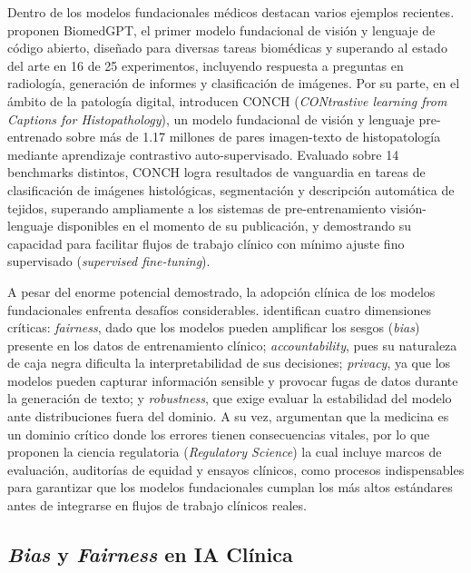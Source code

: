 Dentro de los modelos fundacionales médicos destacan varios ejemplos recientes. \textcite{Zhang2024}
proponen
BiomedGPT, el primer modelo fundacional de visión y lenguaje de código abierto, diseñado para 
diversas tareas biomédicas y superando al estado del arte en 16 de
25 experimentos, incluyendo respuesta a preguntas en radiología, generación de
informes y clasificación de imágenes. Por su parte, en el ámbito de la patología digital, \textcite{Lu2024}
introducen CONCH (\textit{CONtrastive learning from Captions for Histopathology}), 
un modelo fundacional de visión y lenguaje
pre-entrenado sobre más de 1.17 millones de pares imagen-texto de histopatología
mediante aprendizaje contrastivo auto-supervisado. Evaluado sobre 14 benchmarks
distintos, CONCH logra resultados de vanguardia en tareas de clasificación de
imágenes histológicas, segmentación y descripción automática de tejidos,
superando ampliamente a los sistemas de
pre-entrenamiento visión-lenguaje disponibles en el momento de su publicación,
y demostrando su capacidad para facilitar flujos de trabajo clínico con mínimo
ajuste fino supervisado (\textit{supervised fine-tuning}).

A pesar del enorme potencial demostrado, la adopción clínica de los modelos
fundacionales enfrenta desafíos considerables. \textcite{liu2024surveymedicallargelanguage} identifican
 cuatro
dimensiones críticas: \textit{fairness}, dado que los modelos pueden amplificar
los sesgos (\textit{bias}) presente en los datos de entrenamiento clínico; \textit{accountability},
pues su naturaleza de caja negra dificulta la interpretabilidad de sus decisiones;
\textit{privacy}, ya que los modelos pueden capturar información sensible y
provocar fugas de datos durante la generación de texto; y \textit{robustness},
que exige evaluar la estabilidad del modelo ante distribuciones fuera del dominio. 
A su vez, \textcite{niu2026foundationmodelsmedicalimaging} argumentan que la medicina es un dominio crítico donde los errores
tienen consecuencias vitales, por lo que proponen la ciencia regulatoria (\textit{Regulatory Science})
la cual incluye marcos de evaluación, auditorías de equidad y ensayos clínicos, 
como procesos indispensables para garantizar que los modelos fundacionales cumplan
los más altos estándares antes de integrarse en flujos de trabajo clínicos reales.


\subsection{\textit{Bias} y \textit{Fairness} en IA Clínica}

